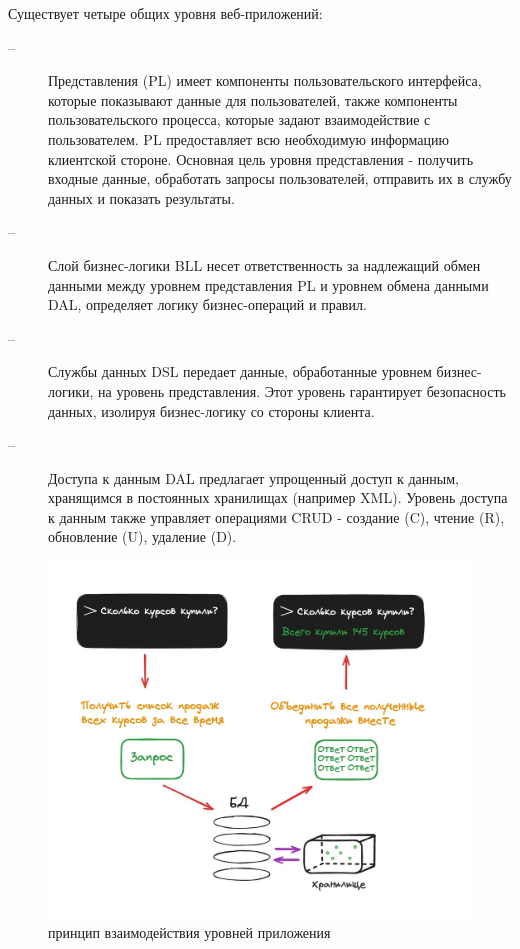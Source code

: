 Существует четыре общих уровня веб-приложений:
\begin{description}
\item[--]Представления (PL) имеет компоненты пользовательского интерфейса, которые показывают данные для пользователей, также
компоненты пользовательского процесса, которые задают взаимодействие с пользователем. PL предоставляет всю необходимую 
информацию клиентской стороне. Основная цель уровня представления - получить входные данные, обработать запросы пользователей,
отправить их в службу данных и показать результаты.

\item[--]Слой бизнес-логики BLL несет ответственность за надлежащий обмен данными между уровнем представления PL и уровнем обмена данными DAL, определяет логику бизнес-операций и правил. 

\item[--]Службы данных DSL передает данные, обработанные уровнем бизнес-логики, на уровень представления. Этот 
уровень гарантирует безопасность данных, изолируя бизнес-логику со стороны клиента.

\item[--]Доступа к данным DAL предлагает упрощенный доступ к данным, хранящимся в постоянных хранилищах (например XML). 
Уровень доступа к данным также управляет операциями CRUD - создание (C), чтение (R), обновление (U), удаление (D).

\end{description}
\begin{figure}[H]
  \centering
  \includegraphics[width=1\textwidth]{pict/2}
  \caption{принцип взаимодействия уровней приложения}
  \label{fig:2}
\end{figure}

